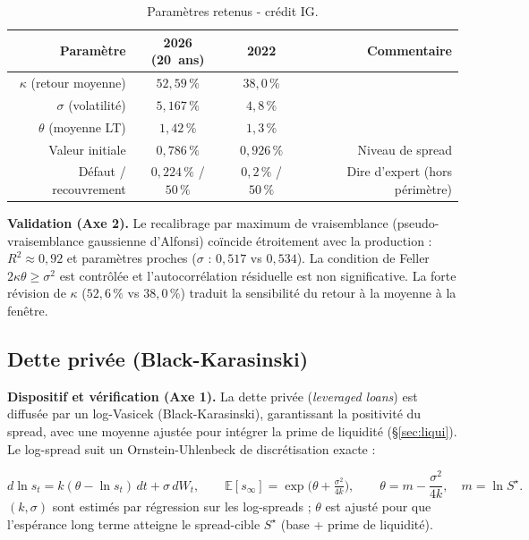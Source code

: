 \documentclass[11pt,a4paper]{article}
\renewcommand{\arraystretch}{1.4}
\newcommand{\tablehead}[1]{\textcolor{nxnavy}{\sffamily\bfseries\small #1}}
\begin{document}
\begin{table}[H]
\centering\small
\renewcommand{\arraystretch}{1.4}\setlength{\tabcolsep}{6pt}
\begin{tabularx}{\linewidth}{R C C R}
\toprule
\tablehead{Paramètre} & \tablehead{2026 (20~ans)} & \tablehead{2022} & \tablehead{Commentaire} \\
\midrule
{} $\kappa$ (retour moyenne) & $52{,}59\,\%$ & $38{,}0\,\%$ & \\
$\sigma$ (volatilité) & $5{,}167\,\%$ & $4{,}8\,\%$ & \\
 $\theta$ (moyenne LT) & $1{,}42\,\%$ & $1{,}3\,\%$ & \\
Valeur initiale & $0{,}786\,\%$ & $0{,}926\,\%$ & Niveau de spread \\
 Défaut / recouvrement & $0{,}224\,\%$ / $50\,\%$ & $0{,}2\,\%$ / $50\,\%$ & Dire d'expert (hors périmètre) \\
\bottomrule
\end{tabularx}
\caption{Paramètres retenus - crédit IG.}
\end{table}

\textbf{Validation (Axe 2).} Le recalibrage par maximum de vraisemblance (pseudo-vraisemblance gaussienne d'Alfonsi) coïncide étroitement avec la production : $R^2\approx0{,}92$ et paramètres proches ($\sigma$ : $0{,}517$ vs $0{,}534$). La condition de Feller $2\kappa\theta\ge\sigma^2$ est contrôlée et l'autocorrélation résiduelle est non significative. La forte révision de $\kappa$ ($52{,}6\,\%$ vs $38{,}0\,\%$) traduit la sensibilité du retour à la moyenne à la fenêtre.

\subsection{Dette privée (Black-Karasinski)}

\textbf{Dispositif et vérification (Axe 1).} La dette privée (\emph{leveraged loans}) est diffusée par un log-Vasicek (Black-Karasinski), garantissant la positivité du spread, avec une moyenne ajustée pour intégrer la prime de liquidité (\S\ref{sec:liqui}). Le log-spread suit un Ornstein-Uhlenbeck de discrétisation exacte :
\begin{definitionbox}
\[
d\ln s_t=k(\theta-\ln s_t)\,dt+\sigma\,dW_t,\qquad
\mathbb E[s_\infty]=\exp\!\Big(\theta+\tfrac{\sigma^2}{4k}\Big),\qquad
\theta=m-\frac{\sigma^2}{4k},\quad m=\ln S^\star .
\]
$(k,\sigma)$ sont estimés par régression sur les log-spreads ; $\theta$ est ajusté pour que l'espérance long terme atteigne le spread-cible $S^\star$ (base + prime de liquidité).
\end{definitionbox}
\end{document}
